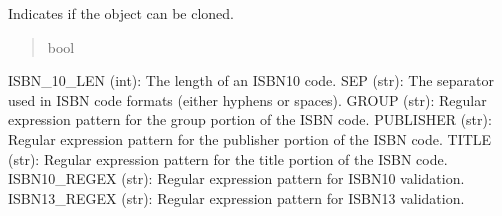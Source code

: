 \documentclass[letterpaper,10pt,english]{sphinxmanual}
\begin{document}
\begin{fulllineitems}

\begin{fulllineitems}
\label{\detokenize{apache_commons_validator_python.routines:apache_commons_validator_python.routines.isbn_validator.ISBNValidator.cloneable}}
\pysigstartsignatures
{}
\pysigstopsignatures
\sphinxAtStartPar
Indicates if the object can be cloned.
\begin{quote}\begin{description}
\sphinxAtStartPar
bool

\end{description}\end{quote}

\end{fulllineitems}

\begin{description}
\sphinxAtStartPar
ISBN\_10\_LEN (int): The length of an ISBN\sphinxhyphen{}10 code.
SEP (str): The separator used in ISBN code formats (either hyphens or spaces).
GROUP (str): Regular expression pattern for the group portion of the ISBN code.
PUBLISHER (str): Regular expression pattern for the publisher portion of the ISBN code.
TITLE (str): Regular expression pattern for the title portion of the ISBN code.
ISBN10\_REGEX (str): Regular expression pattern for ISBN\sphinxhyphen{}10 validation.
ISBN13\_REGEX (str): Regular expression pattern for ISBN\sphinxhyphen{}13 validation.

\end{description}

\begin{fulllineitems}
\label{\detokenize{apache_commons_validator_python.routines:apache_commons_validator_python.routines.isbn_validator.ISBNValidator.ISBN10_REGEX}}
\pysigstartsignatures
{}
\pysigstopsignatures
\end{fulllineitems}


\end{fulllineitems}
\end{document}
